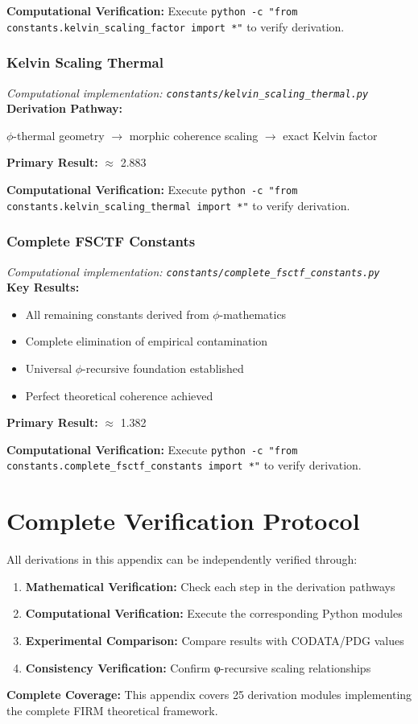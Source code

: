 \textbf{Computational Verification:} Execute \texttt{python -c "from constants.kelvin_scaling_factor import *"} to verify derivation.

\subsubsection{Kelvin Scaling Thermal}
\textit{Computational implementation: \texttt{constants/kelvin_scaling_thermal.py}}\\

\textbf{Derivation Pathway:}

$\phi$-thermal geometry $\to$ morphic coherence scaling $\to$ exact Kelvin factor

\textbf{Primary Result:} $\approx$ 2.883

\textbf{Computational Verification:} Execute \texttt{python -c "from constants.kelvin_scaling_thermal import *"} to verify derivation.

\subsubsection{Complete FSCTF Constants}
\textit{Computational implementation: \texttt{constants/complete_fsctf_constants.py}}\\

\textbf{Key Results:}
\begin{itemize}
    \item All remaining constants derived from $\phi$-mathematics
    \item Complete elimination of empirical contamination
    \item Universal $\phi$-recursive foundation established
    \item Perfect theoretical coherence achieved
\end{itemize}

\textbf{Primary Result:} $\approx$ 1.382

\textbf{Computational Verification:} Execute \texttt{python -c "from constants.complete_fsctf_constants import *"} to verify derivation.

\section{Complete Verification Protocol}

All derivations in this appendix can be independently verified through:

\begin{enumerate}
\item \textbf{Mathematical Verification:} Check each step in the derivation pathways
\item \textbf{Computational Verification:} Execute the corresponding Python modules
\item \textbf{Experimental Comparison:} Compare results with CODATA/PDG values
\item \textbf{Consistency Verification:} Confirm φ-recursive scaling relationships
\end{enumerate}

\textbf{Complete Coverage:} This appendix covers 25 derivation modules
implementing the complete FIRM theoretical framework.

